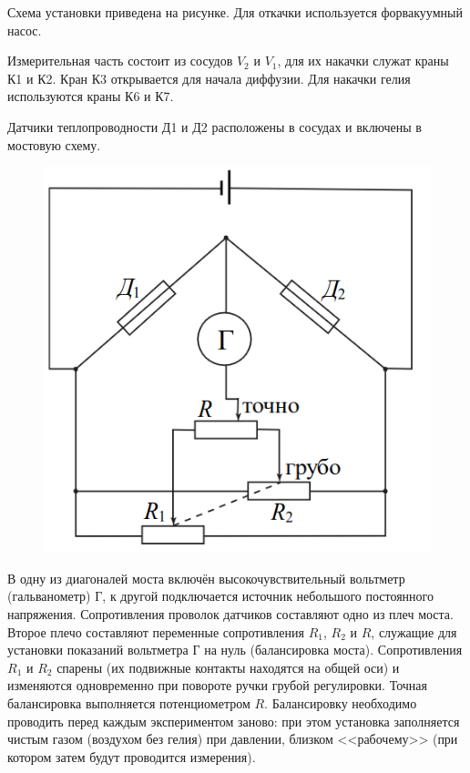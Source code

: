 Схема установки приведена на рисунке. Для откачки используется форвакуумный насос.

Измерительная часть состоит из сосудов $V_2$ и $V_1$, для их накачки служат краны
К1 и К2. Кран К3 открывается для начала диффузии. Для накачки гелия используются
краны К6 и К7.

Датчики теплопроводности Д1 и Д2 расположены в сосудах и включены в мостовую схему.
\begin{figure}[ht!]
    \centering\includegraphics[width=0.4\linewidth]{img/eq2.png}
\end{figure}

В одну из диагоналей
моста включён высокочувствительный
вольтметр (гальванометр) Г, к другой подключается источник небольшого постоянного
напряжения. Сопротивления проволок датчиков составляют одно из плеч моста. Второе
плечо составляют переменные сопротивления
$R_1$, $R_2$ и $R$, служащие для установки показаний вольтметра Г на нуль
(балансировка моста). Сопротивления $R_1$ и $R_2$ спарены (их подвижные контакты находятся
на общей оси) и изменяются одновременно при повороте ручки грубой
регулировки. Точная балансировка выполняется потенциометром $R$. Балансировку
необходимо проводить перед каждым экспериментом заново: при
этом установка заполняется чистым газом (воздухом без гелия) при давлении, близком
<<рабочему>> (при котором затем будут проводится измерения).
